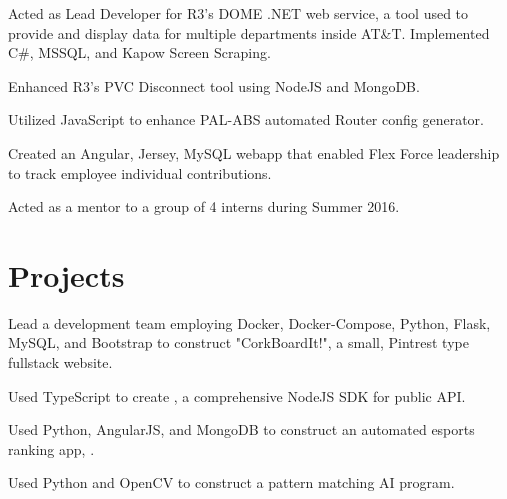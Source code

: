 \documentclass[]{deedy-resume-openfont}
\begin{document}
\begin{minipage}[t]{0.66\textwidth}
\begin{tightemize}
\item Acted as Lead Developer for R3’s DOME .NET web service, a tool used to provide and display data for multiple departments inside AT\&T. Implemented C\#, MSSQL, and Kapow Screen Scraping.
\item Enhanced R3's PVC Disconnect tool using NodeJS and MongoDB.
\item Utilized JavaScript to enhance PAL-ABS automated Router config generator.
\item Created an Angular, Jersey, MySQL webapp that enabled Flex Force leadership to track employee individual contributions.
\item Acted as a mentor to a group of 4 interns during Summer 2016.
\end{tightemize}
\sectionsep


\sectionsep



\section{Projects}
\begin{tightemize} 
\item Lead a development team employing Docker, Docker-Compose, Python, Flask, MySQL, and Bootstrap to construct "CorkBoardIt!", a small, Pintrest type fullstack website. 
\item Used TypeScript to create  \href{http://npmjs.com/package/smashgg.js}{}, a comprehensive NodeJS SDK for \href{www.smash.gg}{} public API.
\item Used Python, AngularJS, and MongoDB to construct an automated esports ranking app, \href{https://notgarpr.com}{}.
\item Used Python and OpenCV to construct a pattern matching AI program.
\end{tightemize}
\sectionsep





\end{minipage} 
\end{document}
